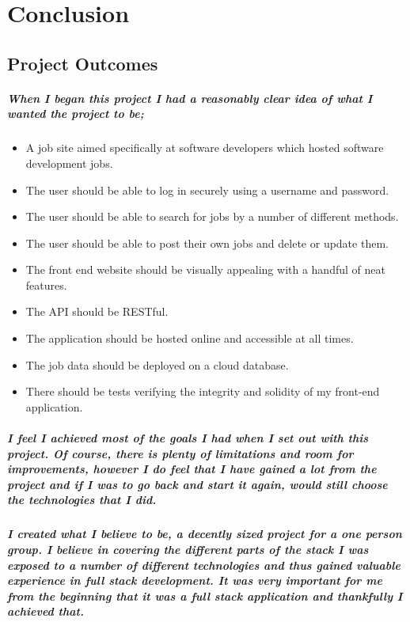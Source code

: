 \chapter{Conclusion}
\section{Project Outcomes}
\paragraph{When I began this project I had a reasonably clear idea of what I wanted the project to be;}
\begin{itemize}
    \item A job site aimed specifically at software developers which hosted software development jobs.
    \item The user should be able to log in securely using a username and password.
    \item The user should be able to search for jobs by a number of different methods.
    \item The user should be able to post their own jobs and delete or update them.
    \item The front end website should be visually appealing with a handful of neat features.
    \item The API should be RESTful.
    \item The application should be hosted online and accessible at all times.
    \item The job data should be deployed on a cloud database.
    \item There should be tests verifying the integrity and solidity of my front-end application.
\end{itemize}
\paragraph{I feel I achieved most of the goals I had when I set out with this project. Of course, there is plenty of limitations and room for improvements, however I do feel that I have gained a lot from the project and if I was to go back and start it again, would still choose the technologies that I did.}
\paragraph{I created what I believe to be, a decently sized project for a one person group. I believe in covering the different parts of the stack I was exposed to a number of different technologies and thus gained valuable experience in full stack development. It was very important for me from the beginning that it was a full stack application and thankfully I achieved that. }
